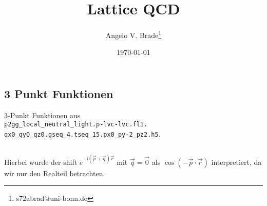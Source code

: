 \documentclass[10pt]{article}
\title{Lattice QCD}
\author[1]{Angelo V. Brade\thanks{s72abrad@uni-bonn.de}}
\affil[1]{Rheinische Friedrich-Wilhelms-Universität Bonn}
\date{\today}
\newenvironment{Figure}
  {\par\medskip\noindent\minipage{\linewidth}}
  {\endminipage\par\medskip}
\begin{document}
\maketitle


\pagestyle{fancy}
\fancyhead[R]{\thepage}
\fancyhead[L]{\leftmark}

\begin{multicols}{2}
\section{3 Punkt Funktionen}
3-Punkt Funktionen aus\\ \texttt{p2gg_local_neutral_light.p-lvc-lvc.fl1.} \\ \texttt{qx0_qy0_qz0.gseq_4.tseq_15.px0_py-2_pz2.h5}.
\subsection{}
\begin{Figure}
  \centering\resizebox{\textwidth}{!}{}
  \label{fig:1.1}
\end{Figure}
\begin{Figure}
  \centering\resizebox{\textwidth}{!}{}
  \label{fig:1.2}
\end{Figure}
\begin{Figure}
  \centering\resizebox{\textwidth}{!}{}
  \label{fig:1.3}
\end{Figure}
\begin{Figure}
  \centering\resizebox{\textwidth}{!}{}
  \label{fig:1.4}
\end{Figure}
Hierbei wurde der shift $e^{-\mathrm{i}(\vec{p}+\vec{q})\vec{r}}$ mit $\vec{q}=\vec{0}$ als $\cos{(-\vec{p}\cdot\vec{r})}$ interpretiert, da wir nur den Realteil betrachten.


\end{multicols}
\end{document}

